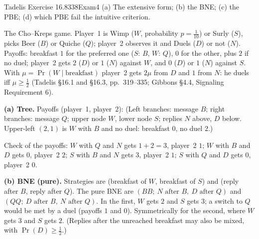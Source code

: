 \begin{exsol}{Tadelis Exercise 16.8}{338}{Exam}{4}
\asked (a) The extensive form; (b) the BNE; (c) the PBE; (d) which PBE fail the intuitive criterion.

\method The Cho--Kreps game. Player~1 is Wimp ($W$, probability $p = \frac1{10}$) or Surly ($S$), picks
Beer ($B$) or Quiche ($Q$); player~2 observes it and Duels ($D$) or not ($N$). Payoffs: breakfast
$1$ for the preferred one ($S$: $B$, $W$: $Q$), $0$ for the other, plus $2$ if no duel; player~2
gets $2$ ($D$) or $1$ ($N$) against $W$, and $0$ ($D$) or $1$ ($N$) against $S$. With $\mu = \Pr(W \mid \text{breakfast})$
player~2 gets $2\mu$ from $D$ and $1$ from $N$: he duels iff $\mu \ge \frac12$ (Tadelis \S16.1 and
\S16.3, pp.~319--335; Gibbons \S4.4, Signaling Requirement 6).

\solution \textbf{(a) Tree.} Payoffs (player~1, player~2):
(Left branches: message $B$; right branches: message $Q$; upper node $W$, lower node $S$; replies $N$
above, $D$ below. Upper-left $(2,1)$ is $W$ with $B$ and no duel: breakfast $0$, no duel $2$.)

Check of the payoffs: $W$ with $Q$ and $N$ gets $1 + 2 = 3$, player~2 $1$; $W$ with $B$ and $D$ gets $0$,
player~2 $2$; $S$ with $B$ and $N$ gets $3$, player~2 $1$; $S$ with $Q$ and $D$ gets $0$, player~2 $0$.

\textbf{(b) BNE (pure).} Strategies are (breakfast of $W$, breakfast of $S$) and (reply after $B$,
reply after $Q$). The pure BNE are $(BB;\ N \text{ after } B,\ D \text{ after } Q)$ and
$(QQ;\ D \text{ after } B,\ N \text{ after } Q)$. In the first, $W$ gets $2$ and $S$ gets $3$; a switch to $Q$
would be met by a duel (payoffs $1$ and $0$). Symmetrically for the second, where $W$ gets $3$ and $S$
gets $2$. (Replies after the unreached breakfast may also be mixed, with $\Pr(D) \ge \frac12$.)


\end{exsol}
